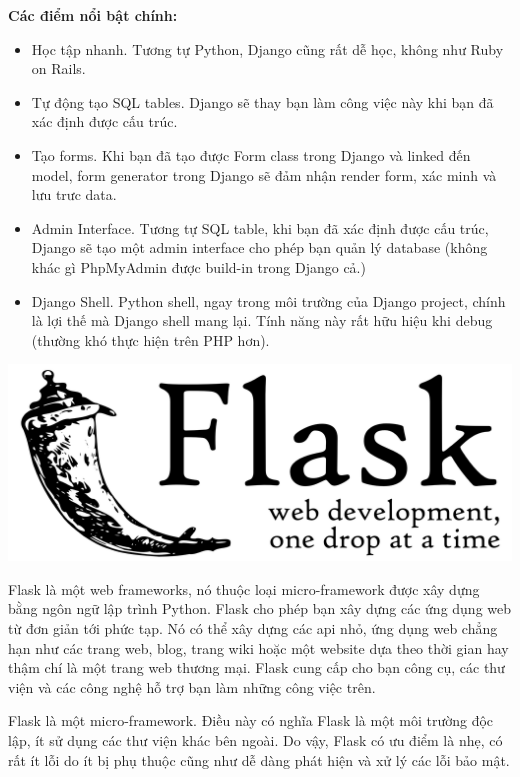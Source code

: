 \textbf{Các điểm nổi bật chính:}
\begin{itemize}
    \item Học tập nhanh. Tương tự Python, Django cũng rất dễ học, không như Ruby on Rails.
    \item Tự động tạo SQL tables. Django sẽ thay bạn làm công việc này khi bạn đã xác định được cấu trúc.
    \item Tạo forms. Khi bạn đã tạo được Form class trong Django và linked đến model, form generator trong Django sẽ đảm nhận render form, xác minh và lưu trưc data.
    \item Admin Interface. Tương tự SQL table, khi bạn đã xác định được cấu trúc, Django sẽ tạo một admin interface cho phép bạn quản lý database (không khác gì PhpMyAdmin được build-in trong Django cả.)
    \item Django Shell. Python shell, ngay trong môi trường của Django project, chính là lợi thế mà Django shell mang lại. Tính năng này rất hữu hiệu khi debug (thường khó thực hiện trên PHP hơn).
\end{itemize}

\begin{center}
  \captionsetup{type=figure}
  \includegraphics[width=15cm]{img/flask.png}
\end{center}

Flask là một web frameworks, nó thuộc loại micro-framework được xây dựng bằng ngôn ngữ lập trình Python. Flask cho phép bạn xây dựng các ứng dụng web từ đơn giản tới phức tạp. Nó có thể xây dựng các api nhỏ, ứng dụng web chẳng hạn như các trang web, blog, trang wiki hoặc một website dựa theo thời gian hay thậm chí là một trang web thương mại. Flask cung cấp cho bạn công cụ, các thư viện và các công nghệ hỗ trợ bạn làm những công việc trên.

Flask là một micro-framework. Điều này có nghĩa Flask là một môi trường độc lập, ít sử dụng các thư viện khác bên ngoài. Do vậy, Flask có ưu điểm là nhẹ, có rất ít lỗi do ít bị phụ thuộc cũng như dễ dàng phát hiện và xử lý các lỗi bảo mật.

